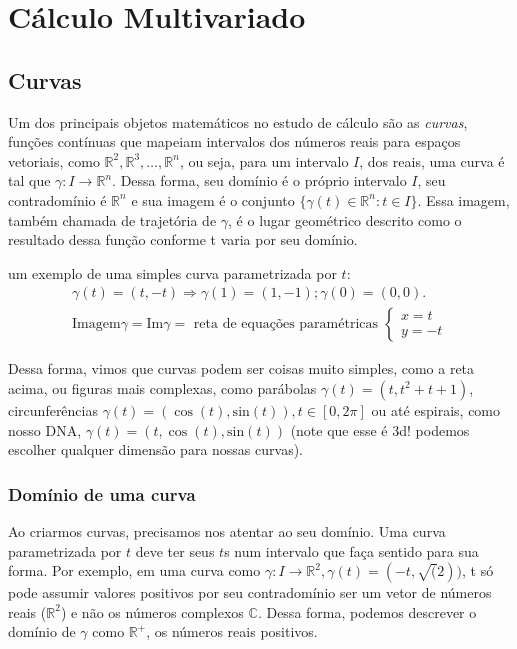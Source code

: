 \documentclass[
  portuguese,
  letterpaper,
  DIV=11,
  numbers=noendperiod]{scrreport}
\begin{document}
\part{Cálculo Multivariado}

\chapter{Curvas}\label{curvas}

Um dos principais objetos matemáticos no estudo de cálculo são as
\emph{curvas}, funções contínuas que mapeiam intervalos dos números
reais para espaços vetoriais, como
\(\mathbb{R}^2, \mathbb{R}^3,\ldots,\mathbb{R}^n\), ou seja, para um
intervalo \(I\), dos reais, uma curva é tal que
\(\gamma : I \rightarrow \mathbb{R}^n\). Dessa forma, seu domínio é o
próprio intervalo \(I\), seu contradomínio é \(\mathbb{R}^n\) e sua
imagem é o conjunto \(\{\gamma(t) \in \mathbb{R}^n : t \in I\}\). Essa
imagem, também chamada de trajetória de \(\gamma\), é o lugar geométrico
descrito como o resultado dessa função conforme t varia por seu domínio.

um exemplo de uma simples curva parametrizada por \(t\): \[
\begin{aligned}
    \gamma(t) = (t, -t) \Rightarrow \gamma(1) = (1, -1); \gamma(0) = (0,0). \\ 
    \mathrm{Imagem}\gamma = \mathrm{Im}\gamma =
    \text{ reta de equações paramétricas } 
    \begin{cases}
        x = t \\
        y = -t
    \end{cases}
\end{aligned}
\]

Dessa forma, vimos que curvas podem ser coisas muito simples, como a
reta acima, ou figuras mais complexas, como parábolas
\(\gamma(t) = (t, t^2 + t + 1)\), circunferências
\(\gamma(t) = (\cos(t),\mathrm{sin}(t)), t \in [0, 2\pi]\) ou até
espirais, como nosso DNA, \(\gamma(t) = (t, \cos(t), \mathrm{sin}(t))\)
(note que esse é 3d! podemos escolher qualquer dimensão para nossas
curvas).

\section{Domínio de uma curva}\label{domuxednio-de-uma-curva}

Ao criarmos curvas, precisamos nos atentar ao seu domínio. Uma curva
parametrizada por \(t\) deve ter seus \(t\)s num intervalo que faça
sentido para sua forma. Por exemplo, em uma curva como
\(\gamma : I \rightarrow \mathbb{R}^2, \gamma(t) = (-t, \sqrt(2))\), t
só pode assumir valores positivos por seu contradomínio ser um vetor de
números reais (\(\mathbb{R}^2\)) e não os números complexos
\(\mathbb{C}\). Dessa forma, podemos descrever o domínio de \(\gamma\)
como \(\mathbb{R}^{+}\), os números reais positivos.
\end{document}
